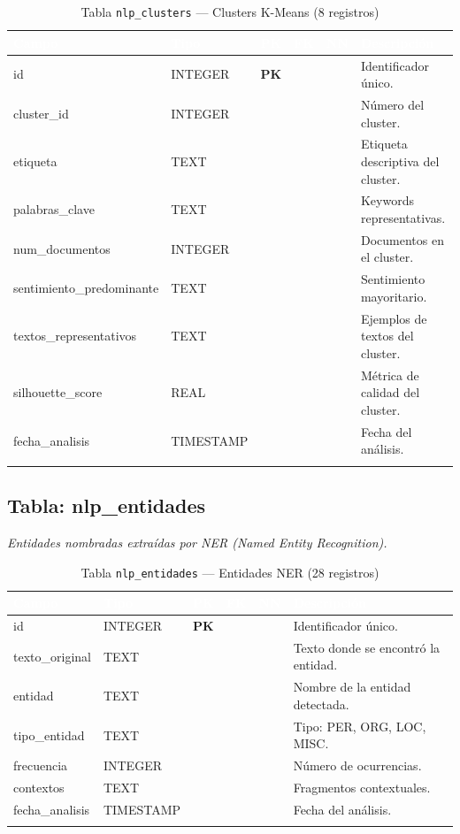 \documentclass[11pt,a4paper]{article}
\newcommand{\tableheadrow}{\rowcolor{tableheader}}
\newcommand{\tablehead}[1]{\textcolor{white}{\textbf{#1}}}
\newcommand{\pk}{\textcolor{emiblue}{\textbf{PK}}}
\begin{document}
\begin{longtable}{p{4.2cm} p{2.8cm} c c c p{4.5cm}}
\toprule
\tableheadrow
\tablehead{Campo} & \tablehead{Tipo} & \tablehead{PK} & \tablehead{FK} & \tablehead{NN} & \tablehead{Descripción} \\
\midrule
\endhead
id & INTEGER & \pk & & & Identificador único. \\
\rowcolor{tablerow}
cluster\_id & INTEGER & & & & Número del cluster. \\
etiqueta & TEXT & & & & Etiqueta descriptiva del cluster. \\
\rowcolor{tablerow}
palabras\_clave & TEXT & & & & Keywords representativas. \\
num\_documentos & INTEGER & & & & Documentos en el cluster. \\
\rowcolor{tablerow}
sentimiento\_predominante & TEXT & & & & Sentimiento mayoritario. \\
textos\_representativos & TEXT & & & & Ejemplos de textos del cluster. \\
\rowcolor{tablerow}
silhouette\_score & REAL & & & & Métrica de calidad del cluster. \\
fecha\_analisis & TIMESTAMP & & & & Fecha del análisis. \\
\bottomrule
\caption{Tabla \texttt{nlp\_clusters} — Clusters K-Means (8 registros)}
\end{longtable}

\subsection{Tabla: nlp\_entidades}
\textit{Entidades nombradas extraídas por NER (Named Entity Recognition).}

\begin{longtable}{p{4.2cm} p{2.8cm} c c c p{4.5cm}}
\toprule
\tableheadrow
\tablehead{Campo} & \tablehead{Tipo} & \tablehead{PK} & \tablehead{FK} & \tablehead{NN} & \tablehead{Descripción} \\
\midrule
\endhead
id & INTEGER & \pk & & & Identificador único. \\
\rowcolor{tablerow}
texto\_original & TEXT & & & & Texto donde se encontró la entidad. \\
entidad & TEXT & & & & Nombre de la entidad detectada. \\
\rowcolor{tablerow}
tipo\_entidad & TEXT & & & & Tipo: PER, ORG, LOC, MISC. \\
frecuencia & INTEGER & & & & Número de ocurrencias. \\
\rowcolor{tablerow}
contextos & TEXT & & & & Fragmentos contextuales. \\
fecha\_analisis & TIMESTAMP & & & & Fecha del análisis. \\
\bottomrule
\caption{Tabla \texttt{nlp\_entidades} — Entidades NER (28 registros)}
\end{longtable}
\end{document}
